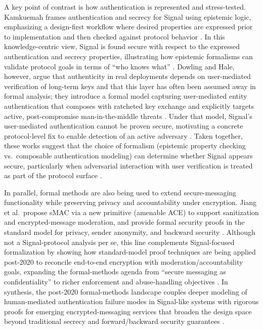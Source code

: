 A key point of contrast is how authentication is represented and stress-tested. Kamkuemah frames authentication and secrecy for Signal using epistemic logic, emphasizing a design-first workflow where desired properties are expressed prior to implementation and then checked against protocol behavior \cite{kamkuemah2021}. In this knowledge-centric view, Signal is found secure with respect to the expressed authentication and secrecy properties, illustrating how epistemic formalisms can validate protocol goals in terms of ``who knows what'' \cite{kamkuemah2021}. Dowling and Hale, however, argue that authenticity in real deployments depends on user-mediated verification of long-term keys and that this layer has often been assumed away in formal analysis; they introduce a formal model capturing user-mediated entity authentication that composes with ratcheted key exchange and explicitly targets active, post-compromise man-in-the-middle threats \cite{dowling2021}. Under that model, Signal's user-mediated authentication cannot be proven secure, motivating a concrete protocol-level fix to enable detection of an active adversary \cite{dowling2021}. Taken together, these works suggest that the choice of formalism (epistemic property checking vs.\ composable authentication modeling) can determine whether Signal appears secure, particularly when adversarial interaction with user verification is treated as part of the protocol surface \cite{kamkuemah2021,dowling2021}.

In parallel, formal methods are also being used to extend secure-messaging functionality while preserving privacy and accountability under encryption. Jiang et al.\ propose sMAC via a new primitive (amenable ACE) to support sanitization and encrypted-message moderation, and provide formal security proofs in the standard model for privacy, sender anonymity, and backward security \cite{jiang2024}. Although not a Signal-protocol analysis per se, this line complements Signal-focused formalization by showing how standard-model proof techniques are being applied post-2020 to reconcile end-to-end encryption with moderation/accountability goals, expanding the formal-methods agenda from ``secure messaging as confidentiality'' to richer enforcement and abuse-handling objectives \cite{jiang2024}. In synthesis, the post-2020 formal-methods landscape couples deeper modeling of human-mediated authentication failure modes in Signal-like systems with rigorous proofs for emerging encrypted-messaging services that broaden the design space beyond traditional secrecy and forward/backward security guarantees \cite{dowling2021,jiang2024}.

